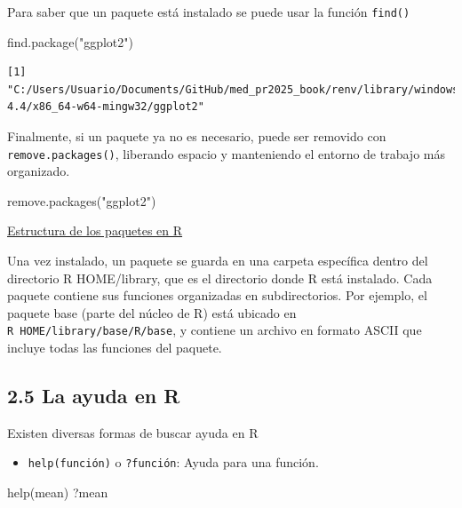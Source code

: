 \documentclass[
  letterpaper,
  DIV=11,
  numbers=noendperiod]{scrreprt}
\newenvironment{Shaded}{\begin{snugshade}}{\end{snugshade}}
\newcommand{\FunctionTok}[1]{\textcolor[rgb]{0.28,0.35,0.67}{#1}}
\newcommand{\NormalTok}[1]{\textcolor[rgb]{0.00,0.23,0.31}{#1}}
\newcommand{\StringTok}[1]{\textcolor[rgb]{0.13,0.47,0.30}{#1}}
\providecommand{\tightlist}{%
  \setlength{\itemsep}{0pt}\setlength{\parskip}{0pt}}\usepackage{longtable,booktabs,array}
\begin{document}
Para saber que un paquete está instalado se puede usar la función
\texttt{find()}

\begin{Shaded}
\begin{Highlighting}[]
\FunctionTok{find.package}\NormalTok{(}\StringTok{"ggplot2"}\NormalTok{)}
\end{Highlighting}
\end{Shaded}

\begin{verbatim}
[1] "C:/Users/Usuario/Documents/GitHub/med_pr2025_book/renv/library/windows/R-4.4/x86_64-w64-mingw32/ggplot2"
\end{verbatim}

Finalmente, si un paquete ya no es necesario, puede ser removido con
\texttt{remove.packages()}, liberando espacio y manteniendo el entorno
de trabajo más organizado.

\begin{Shaded}
\begin{Highlighting}[]
\FunctionTok{remove.packages}\NormalTok{(}\StringTok{"ggplot2"}\NormalTok{)}
\end{Highlighting}
\end{Shaded}

\uline{Estructura de los paquetes en R}

Una vez instalado, un paquete se guarda en una carpeta específica dentro
del directorio R HOME/library, que es el directorio donde R está
instalado. Cada paquete contiene sus funciones organizadas en
subdirectorios. Por ejemplo, el paquete base (parte del núcleo de R)
está ubicado en \texttt{R\ HOME/library/base/R/base}, y contiene un
archivo en formato ASCII que incluye todas las funciones del paquete.

\hypertarget{la-ayuda-en-r}{%
\subsection{2.5 La ayuda en R}\label{la-ayuda-en-r}}

Existen diversas formas de buscar ayuda en R

\begin{itemize}
\tightlist
\item
  \texttt{help(función)} o \texttt{?función}: Ayuda para una función.
\end{itemize}

\begin{Shaded}
\begin{Highlighting}[]
\FunctionTok{help}\NormalTok{(mean)}
\NormalTok{?mean}
\end{Highlighting}
\end{Shaded}
\end{document}
